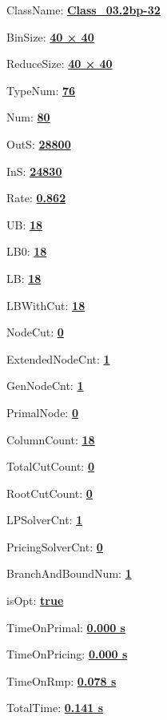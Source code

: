 \documentclass[11pt]{article}
\begin{document}
\pagestyle{empty}


ClassName: \underline{\textbf{Class_03.2bp-32}}
\par
BinSize: \underline{\textbf{40 × 40}}
\par
ReduceSize: \underline{\textbf{40 × 40}}
\par
TypeNum: \underline{\textbf{76}}
\par
Num: \underline{\textbf{80}}
\par
OutS: \underline{\textbf{28800}}
\par
InS: \underline{\textbf{24830}}
\par
Rate: \underline{\textbf{0.862}}
\par
UB: \underline{\textbf{18}}
\par
LB0: \underline{\textbf{18}}
\par
LB: \underline{\textbf{18}}
\par
LBWithCut: \underline{\textbf{18}}
\par
NodeCut: \underline{\textbf{0}}
\par
ExtendedNodeCnt: \underline{\textbf{1}}
\par
GenNodeCnt: \underline{\textbf{1}}
\par
PrimalNode: \underline{\textbf{0}}
\par
ColumnCount: \underline{\textbf{18}}
\par
TotalCutCount: \underline{\textbf{0}}
\par
RootCutCount: \underline{\textbf{0}}
\par
LPSolverCnt: \underline{\textbf{1}}
\par
PricingSolverCnt: \underline{\textbf{0}}
\par
BranchAndBoundNum: \underline{\textbf{1}}
\par
isOpt: \underline{\textbf{true}}
\par
TimeOnPrimal: \underline{\textbf{0.000 s}}
\par
TimeOnPricing: \underline{\textbf{0.000 s}}
\par
TimeOnRmp: \underline{\textbf{0.078 s}}
\par
TotalTime: \underline{\textbf{0.141 s}}
\par
\newpage


\end{document}
